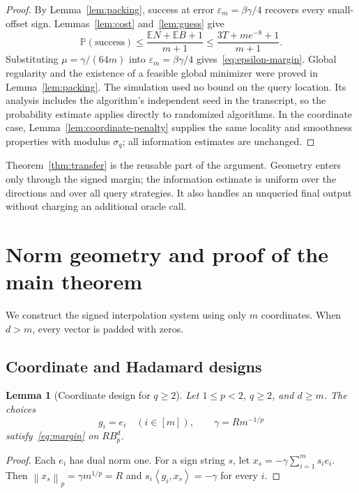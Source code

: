 \documentclass[11pt,a4paper]{article}
\newtheorem{lemma}[theorem]{Lemma}
\theoremstyle{definition}
\theoremstyle{remark}
\newcommand{\E}{\mathbb E}
\newcommand{\Prb}{\mathbb P}
\newcommand{\eps}{\varepsilon}
\newcommand{\norm}[1]{\left\lVert #1\right\rVert}
\newcommand{\ip}[2]{\left\langle #1,#2\right\rangle}
\begin{document}
\begin{proof}
By Lemma~\ref{lem:packing}, success at error $\eps_m=\beta\gamma/4$
recovers every small-offset sign. Lemmas~\ref{lem:cost} and~\ref{lem:guess}
give
\[
 \Prb(\text{success})
 \le\frac{\E N+\E B+1}{m+1}
 \le\frac{3T+me^{-8}+1}{m+1}.
\]
Substituting $\mu=\gamma/(64m)$ into
$\eps_m=\beta\gamma/4$ gives~\eqref{eq:epsilon-margin}.
Global regularity and the existence of a feasible global minimizer were
proved in Lemma~\ref{lem:packing}. The simulation used no bound on the
query location. Its analysis includes the algorithm's independent seed in
the transcript, so the probability estimate applies directly to randomized
algorithms. In the coordinate case,
Lemma~\ref{lem:coordinate-penalty} supplies the same locality and smoothness
properties with modulus $\sigma_q$; all information estimates are unchanged.
\end{proof}

Theorem~\ref{thm:transfer} is the reusable part of the argument. Geometry
enters only through the signed margin; the information estimate is uniform
over the directions and over all query strategies. It also handles an
unqueried final output without charging an additional oracle call.

\section{Norm geometry and proof of the main theorem}\label{sec:geometry}

We construct the signed interpolation system using only $m$ coordinates.
When $d>m$, every vector is padded with zeros.

\subsection{Coordinate and Hadamard designs}

\begin{lemma}[Coordinate design for $q\ge2$]\label{lem:coords}
Let $1\le p<2$, $q\ge2$, and $d\ge m$. The choices
\[
   g_i=e_i\quad(i\in[m]),\qquad \gamma=Rm^{-1/p}
\]
satisfy~\eqref{eq:margin} on $RB_p^d$.
\end{lemma}

\begin{proof}
Each $e_i$ has dual norm one. For a sign string $s$, let
$x_s=-\gamma\sum_{i=1}^m s_i e_i$.
Then $\norm{x_s}_p=\gamma m^{1/p}=R$ and
$s_i\ip{g_i}{x_s}=-\gamma$ for every $i$.
\end{proof}
\end{document}
